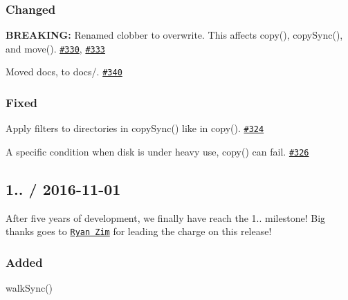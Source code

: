 \subsubsection*{Changed}


\begin{DoxyItemize}
\item {\bfseries B\+R\+E\+A\+K\+I\+NG\+:} Renamed {\ttfamily clobber} to {\ttfamily overwrite}. This affects {\ttfamily copy()}, {\ttfamily copy\+Sync()}, and {\ttfamily move()}. \href{https://github.com/jprichardson/node-fs-extra/pull/330}{\tt \#330}, \href{https://github.com/jprichardson/node-fs-extra/pull/333}{\tt \#333}
\item Moved docs, to {\ttfamily docs/}. \href{https://github.com/jprichardson/node-fs-extra/pull/340}{\tt \#340}
\end{DoxyItemize}

\subsubsection*{Fixed}


\begin{DoxyItemize}
\item Apply filters to directories in {\ttfamily copy\+Sync()} like in {\ttfamily copy()}. \href{https://github.com/jprichardson/node-fs-extra/pull/324}{\tt \#324}
\item A specific condition when disk is under heavy use, {\ttfamily copy()} can fail. \href{https://github.com/jprichardson/node-fs-extra/issues/326}{\tt \#326}
\end{DoxyItemize}

\subsection*{1.. / 2016-\/11-\/01 }

After five years of development, we finally have reach the 1.. milestone! Big thanks goes to \href{https://github.com/RyanZim}{\tt Ryan Zim} for leading the charge on this release!

\subsubsection*{Added}


\begin{DoxyItemize}
\item {\ttfamily walk\+Sync()}
\end{DoxyItemize}

